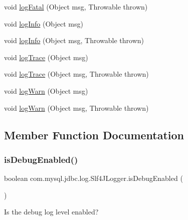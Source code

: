 \begin{DoxyCompactItemize}
void \mbox{\hyperlink{classcom_1_1mysql_1_1jdbc_1_1log_1_1_slf4_j_logger_a10bac00b095b12a28fbd9e988e50504e}{log\+Fatal}} (Object msg, Throwable thrown)
\item 
void \mbox{\hyperlink{classcom_1_1mysql_1_1jdbc_1_1log_1_1_slf4_j_logger_a383e3eb38412b93808048a0df9f74083}{log\+Info}} (Object msg)
\item 
void \mbox{\hyperlink{classcom_1_1mysql_1_1jdbc_1_1log_1_1_slf4_j_logger_a5dd28a46f364c29f13314a76c075b2d5}{log\+Info}} (Object msg, Throwable thrown)
\item 
void \mbox{\hyperlink{classcom_1_1mysql_1_1jdbc_1_1log_1_1_slf4_j_logger_ae3f7e3b7c4ec00f13fa13e67ce26f471}{log\+Trace}} (Object msg)
\item 
void \mbox{\hyperlink{classcom_1_1mysql_1_1jdbc_1_1log_1_1_slf4_j_logger_ac0e1bf43fefe1495aba1042cf46c1e0c}{log\+Trace}} (Object msg, Throwable thrown)
\item 
void \mbox{\hyperlink{classcom_1_1mysql_1_1jdbc_1_1log_1_1_slf4_j_logger_a8b048f288f99466e1c687c84a472dca2}{log\+Warn}} (Object msg)
\item 
void \mbox{\hyperlink{classcom_1_1mysql_1_1jdbc_1_1log_1_1_slf4_j_logger_a2588349587df84982b22529a87072bb8}{log\+Warn}} (Object msg, Throwable thrown)
\end{DoxyCompactItemize}


\subsection{Member Function Documentation}
\mbox{\label{classcom_1_1mysql_1_1jdbc_1_1log_1_1_slf4_j_logger_a3c624bc8c184e4d8790c3ee768492674}} 
\subsubsection{\texorpdfstring{is\+Debug\+Enabled()}{isDebugEnabled()}}
{\footnotesize\ttfamily boolean com.\+mysql.\+jdbc.\+log.\+Slf4\+J\+Logger.\+is\+Debug\+Enabled (\begin{DoxyParamCaption}{ }\end{DoxyParamCaption})}

Is the \textquotesingle{}debug\textquotesingle{} log level enabled?

